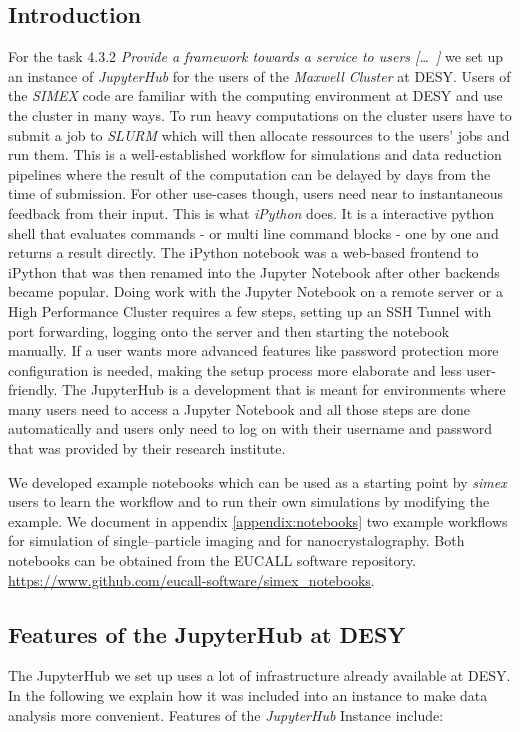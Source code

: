 \documentclass[10pt]{scrartcl}
\begin{document}
\subsection{Introduction}
For the task 4.3.2 \textit{Provide a framework towards a service to users [\dots\ ] } we set up an instance of \textit{JupyterHub} for the users of the \textit{Maxwell Cluster} at \textsc{DESY}.
Users of the \textit{SIMEX} code are familiar with the computing environment at \textsc{DESY} and use the cluster in many ways.
To run heavy computations on the cluster users have to submit a job to \textit{SLURM} which will then allocate ressources to the users' jobs and run them.
This is a well-established workflow for simulations and data reduction pipelines where the result of the
computation can be delayed by days from the time of submission.
For other use-cases though, users need near to instantaneous feedback from their input.
This is what \textit{iPython} does. It is a interactive python shell that evaluates commands - or multi line command blocks - one by one and returns a result directly.
The iPython notebook was a web-based frontend to iPython that was then renamed into the Jupyter Notebook after other backends became popular.
Doing work with the Jupyter Notebook on a remote server or a High Performance Cluster requires a few steps, setting up an SSH Tunnel with port forwarding, logging onto the server and then starting the notebook manually.
If a user wants more advanced features like password protection more configuration is needed, making the setup process more elaborate and less user-friendly.
The JupyterHub is a development that is meant for environments where many users need to access a Jupyter Notebook and all those steps are done automatically and users only need to log on with their username and password that was provided by their research institute. 

We developed example notebooks which can be used as a starting point by
\textit{simex} users to learn the workflow and to run their own simulations by
modifying the example. We document in appendix \ref{appendix:notebooks}
two example workflows for simulation of
single--particle imaging and for nanocrystalography. Both notebooks can be
obtained from the EUCALL software repository.
\url{https://www.github.com/eucall-software/simex_notebooks}.

\subsection{Features of the JupyterHub at DESY}
The JupyterHub we set up uses a lot of infrastructure already available at DESY.
In the following we explain how it was included into an instance to make data analysis more convenient.
Features of the \textit{JupyterHub} Instance include:
\end{document}
